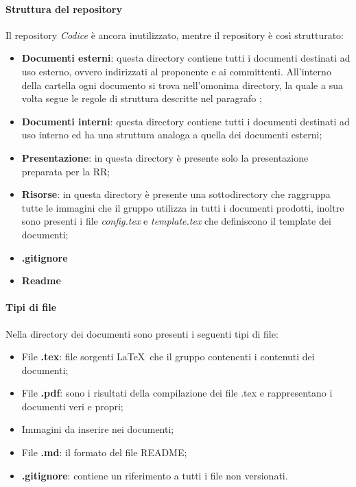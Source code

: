\paragraph{Struttura del repository}
\label{par:struttura_repo}
Il repository \emph{Codice} è ancora inutilizzato, mentre il repository  è così strutturato:
\begin{itemize}
    \item \textbf{Documenti esterni}: questa directory contiene tutti i documenti destinati ad uso esterno, ovvero 
    indirizzati al proponente e ai committenti. All'interno della cartella ogni documento si trova nell'omonima 
    directory, la quale a sua volta segue le regole di struttura descritte nel paragrafo ;
    \item \textbf{Documenti interni}: questa directory contiene tutti i documenti destinati ad uso interno ed ha una 
    struttura analoga a quella dei documenti esterni;
    \item \textbf{Presentazione}: in questa directory è presente solo la presentazione preparata per la RR;
    \item \textbf{Risorse}: in questa directory è presente una sottodirectory che raggruppa tutte le immagini che il 
    gruppo utilizza in tutti i documenti prodotti, inoltre sono presenti i file \emph{config.tex} e \emph{template.tex} 
    che definiscono il template dei documenti;
    \item \textbf{.gitignore}
    \item \textbf{Readme}
\end{itemize}

\paragraph{Tipi di file}
\label{par:tipi_file}
Nella directory dei documenti sono presenti i seguenti tipi di file:
\begin{itemize}
    \item File \textbf{.tex}: file sorgenti \LaTeX\ che il gruppo contenenti i contenuti dei documenti;
    \item File \textbf{.pdf}: sono i risultati della compilazione dei file .tex e rappresentano i documenti veri e propri;
    \item Immagini da inserire nei documenti;
    \item File \textbf{.md}: il formato del file README;
    \item \textbf{.gitignore}: contiene un riferimento a tutti i file non versionati.
\end{itemize}

